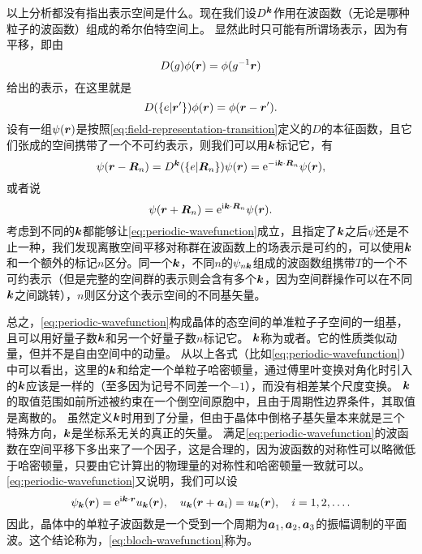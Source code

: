 以上分析都没有指出表示空间是什么。现在我们设$D^{\vb*{k}}$作用在波函数（无论是哪种粒子的波函数）组成的希尔伯特空间上。
显然此时只可能有所谓场表示，因为有平移，即由
\[
    D(g) \phi(\vb*{r}) = \phi(g^{-1} \vb*{r})
\]
给出的表示，在这里就是
\begin{equation}
    D(\{e | \vb*{r}' \}) \phi(\vb*{r}) = \phi(\vb*{r} - \vb*{r}'). 
    \label{eq:field-representation-transition}
\end{equation}
设有一组$\psi(\vb*{r})$是按照\eqref{eq:field-representation-transition}定义的$D$的本征函数，且它们张成的空间携带了一个不可约表示，则我们可以用$\vb*{k}$标记它，有
\begin{equation}
    \psi(\vb*{r} - \vb*{R}_n) = D^{\vb*{k}}(\{e | \vb*{R}_n \}) \psi(\vb*{r}) = \mathrm{e}^{- \mathrm{i} \vb*{k} \cdot \vb*{R}_n} \psi(\vb*{r}),
\end{equation}
或者说
\begin{equation}
    \psi(\vb*{r}+\vb*{R}_n) = \mathrm{e}^{\mathrm{i} \vb*{k} \cdot \vb*{R}_n} \psi(\vb*{r}).
    \label{eq:periodic-wavefunction}
\end{equation}
考虑到不同的$\vb*{k}$都能够让\eqref{eq:periodic-wavefunction}成立，且指定了$\vb*{k}$之后$\psi$还是不止一种，我们发现离散空间平移对称群在波函数上的场表示是可约的，可以使用$\vb*{k}$和一个额外的标记$n$区分。同一个$\vb*{k}$，不同$n$的$\psi_{n \vb*{k}}$组成的波函数组携带$T$的一个不可约表示（但是完整的空间群的表示则会含有多个$\vb*{k}$，因为空间群操作可以在不同$\vb*{k}$之间跳转），$n$则区分这个表示空间的不同基矢量。

总之，\eqref{eq:periodic-wavefunction}构成晶体的态空间的单准粒子子空间的一组基，且可以用好量子数$\vb*{k}$和另一个好量子数$n$标记它。
$\vb*{k}$称为或者。它的性质类似动量，但并不是自由空间中的动量。
从以上各式（比如\eqref{eq:periodic-wavefunction}）中可以看出，这里的$\vb*{k}$和给定一个单粒子哈密顿量，通过傅里叶变换对角化时引入的$\vb*{k}$应该是一样的（至多因为记号不同差一个$-1$），而没有相差某个尺度变换。
$\vb*{k}$的取值范围如前所述被约束在一个倒空间原胞中，且由于周期性边界条件，其取值是离散的。
虽然定义$\vb*{k}$时用到了分量，但由于晶体中倒格子基矢量本来就是三个特殊方向，$\vb*{k}$是坐标系无关的真正的矢量。
满足\eqref{eq:periodic-wavefunction}的波函数在空间平移下多出来了一个因子，这是合理的，因为波函数的对称性可以略微低于哈密顿量，只要由它计算出的物理量的对称性和哈密顿量一致就可以。
\eqref{eq:periodic-wavefunction}又说明，我们可以设
\begin{equation}
    \psi_{\vb*{k}}(\vb*{r}) = \mathrm{e}^{\mathrm{i} \vb*{k} \cdot \vb*{r}} u_{\vb*{k}}(\vb*{r}), \quad u_{\vb*{k}}(\vb*{r}+\vb*{a}_i) = u_{\vb*{k}}(\vb*{r}), \quad i = 1, 2, \ldots.
    \label{eq:bloch-wavefunction}
\end{equation}
因此，晶体中的单粒子波函数是一个受到一个周期为$\vb*{a}_1,\vb*{a}_2, \vb*{a}_3$的振幅调制的平面波。这个结论称为，\eqref{eq:bloch-wavefunction}称为。



